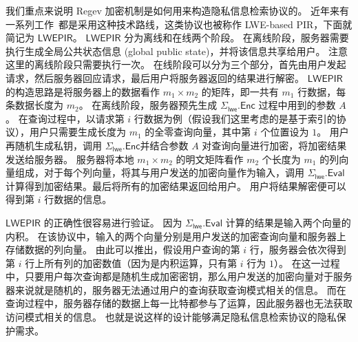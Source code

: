我们重点来说明 Regev 加密机制是如何用来构造隐私信息检索协议的。
近年来有一系列工作~\cite{davidson2023frodopir,henzinger2023one,zhou2023optimal}都是采用这种技术路线，这类协议也被称作 LWE-based PIR，下面就简记为 $\mathsf{LWEPIR}$。
$\mathsf{LWEPIR}$ 分为离线和在线两个阶段。
在离线阶段，服务器需要执行生成全局公共状态信息 (global public state)，并将该信息共享给用户。
注意这里的离线阶段只需要执行一次。
在线阶段可以分为三个部分，首先由用户发起请求，然后服务器回应请求，最后用户将服务器返回的结果进行解密。
$\mathsf{LWEPIR}$ 的构造思路是将服务器上的数据看作 $m_1 \times m_2$ 的矩阵，即一共有 $m_1$ 行数据，每条数据长度为 $m_2$。
在离线阶段，服务器预先生成 $\Sigma_{\mathsf{lwe}}.\mathsf{Enc}$ 过程中用到的参数 $A$。
在查询过程中，以请求第 $i$ 行数据为例（假设我们这里考虑的是基于索引的协议），用户只需要生成长度为 $m_1$ 的全零查询向量，其中第 $i$ 个位置设为 $1$。
用户再随机生成私钥，调用 $\Sigma_{\mathsf{lwe}}.\mathsf{Enc}$并结合参数 $A$ 对查询向量进行加密，将加密结果发送给服务器。
服务器将本地 $m_1 \times m_2$ 的明文矩阵看作 $m_2$ 个长度为 $m_1$ 的列向量组成，对于每个列向量，将其与用户发送的加密向量作为输入，调用 $\Sigma_{\mathsf{lwe}}.\mathsf{Eval}$ 计算得到加密结果。最后将所有的加密结果返回给用户。
用户将结果解密便可以得到第 $i$ 行数据的信息。

$\mathsf{LWEPIR}$ 的正确性很容易进行验证。
因为 $\Sigma_{\mathsf{lwe}}.\mathsf{Eval}$ 计算的结果是输入两个向量的内积。
在该协议中，输入的两个向量分别是用户发送的加密查询向量和服务器上存储数据的列向量。
由此可以推出，假设用户查询的第 $i$ 行，服务器会依次得到第 $i$ 行上所有列的加密数值（因为是内积运算，只有第 $i$ 行为 $1$）。
在这一过程中，只要用户每次查询都是随机生成加密密钥，那么用户发送的加密向量对于服务器来说就是随机的，服务器无法通过用户的查询获取查询模式相关的信息。
而在查询过程中，服务器存储的数据上每一比特都参与了运算，因此服务器也无法获取访问模式相关的信息。
也就是说这样的设计能够满足隐私信息检索协议的隐私保护需求。

